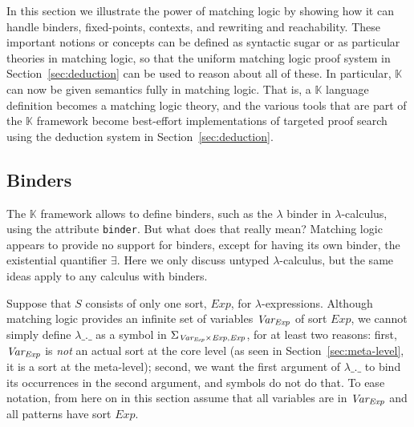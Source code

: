 \documentclass[UTF8,11pt]{article}
\theoremstyle{plain}
\theoremstyle{definition}
\theoremstyle{remark}
\newcommand{\K}{\mbox{$\mathbb{K}$}\xspace}
\newcommand{\Exp}{\textit{Exp}}
\begin{document}
In this section we illustrate the power of matching logic by showing how it can
handle binders, fixed-points, contexts, and rewriting and reachability.
These important notions or concepts can be defined as syntactic sugar or as
particular theories in matching logic, so that the uniform matching logic proof
system in Section~\ref{sec:deduction} can be used to reason about all of these.
In particular, \K can now be given semantics fully in matching logic.
That is, a \K language definition becomes a matching logic theory, and the
various tools that are part of the \K framework become best-effort
implementations of targeted proof search using the deduction system in
Section~\ref{sec:deduction}.

\subsection{Binders}
\label{sec:binders}

The \K framework allows to define binders, such as the $\lambda$ binder in
$\lambda$-calculus, using the attribute \texttt{binder}.
But what does that really mean?
Matching logic appears to provide no support for binders, except for having
its own binder, the existential quantifier $\exists$.
Here we only discuss untyped $\lambda$-calculus, but the same ideas apply to
any calculus with binders.

Suppose that $S$ consists of only one sort, $\Exp$, for $\lambda$-expressions.
Although matching logic provides an infinite set of variables $\Var_\Exp$ of
sort $\Exp$, we cannot simply define $\lambda\_.\_$ as a symbol in
$\Sigma_{\Var_\Exp \times \Exp, \Exp}$, for at least two reasons:
first, $\Var_\Exp$ is \emph{not} an actual sort at the core level
(as seen in Section~\ref{sec:meta-level}, it is a sort at the meta-level);
second, we want the first argument of $\lambda\_.\_$ to bind its occurrences
in the second argument, and symbols do not do that.
To ease notation, from here on in this section assume that all variables
are in $\Var_\Exp$ and all patterns have sort $\Exp$.
\end{document}
